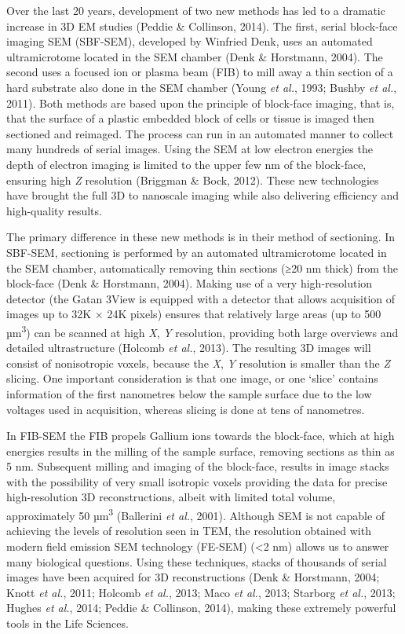 \documentclass{article}
\begin{document}
Over the last 20 years, development of two new methods has led to a dramatic increase in 3D EM studies (Peddie \& Collinson, 2014). The first, serial block-face imaging SEM (SBF-SEM), developed by Winfried Denk, uses an automated ultramicrotome located in the SEM chamber (Denk \& Horstmann, 2004). The second uses a focused ion or plasma beam (FIB) to mill away a thin section of a hard substrate also done in the SEM chamber (Young \textit{et al.}, 1993; Bushby \textit{et al.}, 2011). Both methods are based upon the principle of block-face imaging, that is, that the surface of a plastic embedded block of cells or tissue is imaged then sectioned and reimaged. The process can run in an automated manner to collect many hundreds of serial images. Using the SEM at low electron energies the depth of electron imaging is limited to the upper few nm of the block-face, ensuring high \textit{Z} resolution (Briggman \& Bock, 2012). These new technologies have brought the full 3D to nanoscale imaging while also delivering efficiency and high-quality results.

The primary difference in these new methods is in their method of sectioning. In SBF-SEM, sectioning is performed by an automated ultramicrotome located in the SEM chamber, automatically removing thin sections (≥20 nm thick) from the block-face (Denk \& Horstmann, 2004). Making use of a very high-resolution detector (the Gatan 3View is equipped with a detector that allows acquisition of images up to 32K × 24K pixels) ensures that relatively large areas (up to 500 µm\textsuperscript{3}) can be scanned at high \textit{X}, \textit{Y} resolution, providing both large overviews and detailed ultrastructure (Holcomb \textit{et al.}, 2013). The resulting 3D images will consist of nonisotropic voxels, because the \textit{X}, \textit{Y} resolution is smaller than the \textit{Z} slicing. One important consideration is that one image, or one ‘slice’ contains information of the first nanometres below the sample surface due to the low voltages used in acquisition, whereas slicing is done at tens of nanometres.

In FIB-SEM the FIB propels Gallium ions towards the block-face, which at high energies results in the milling of the sample surface, removing sections as thin as 5 nm. Subsequent milling and imaging of the block-face, results in image stacks with the possibility of very small isotropic voxels providing the data for precise high-resolution 3D reconstructions, albeit with limited total volume, approximately 50 µm\textsuperscript{3} (Ballerini \textit{et al.}, 2001). Although SEM is not capable of achieving the levels of resolution seen in TEM, the resolution obtained with modern field emission SEM technology (FE-SEM) (<2 nm) allows us to answer many biological questions. Using these techniques, stacks of thousands of serial images have been acquired for 3D reconstructions (Denk \& Horstmann, 2004; Knott \textit{et al.}, 2011; Holcomb \textit{et al.}, 2013; Maco \textit{et al.}, 2013; Starborg \textit{et al.}, 2013; Hughes \textit{et al.}, 2014; Peddie \& Collinson, 2014), making these extremely powerful tools in the Life Sciences.
\end{document}
